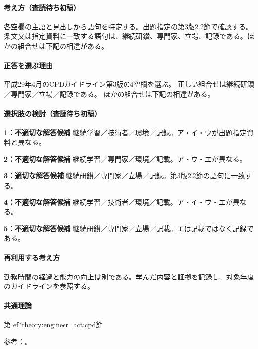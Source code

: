 \paragraph{考え方（査読待ち初稿）} 各空欄の主語と見出しから語句を特定する。出題指定の第3版2.2節で確認する。 条文又は指定資料に一致する語句は、継続研鑚、専門家、立場、記録である。ほかの組合せは下記の相違がある。

\paragraph{正答を選ぶ理由} 平成29年4月のCPDガイドライン第3版の4空欄を選ぶ。 正しい組合せは継続研鑚／専門家／立場／記録である。 ほかの組合せは下記の相違がある。

\paragraph{選択肢の検討（査読待ち初稿）}

\noindent\textbf{1：不適切な解答候補} 継続学習／技術者／環境／記録。ア・イ・ウが出題指定資料と異なる。\par

\noindent\textbf{2：不適切な解答候補} 継続学習／専門家／環境／記載。ア・ウ・エが異なる。\par

\noindent\textbf{3：適切な解答候補} 継続研鑚／専門家／立場／記録。第3版2.2節の語句に一致する。\par

\noindent\textbf{4：不適切な解答候補} 継続学習／技術者／環境／記載。ア・イ・ウ・エが異なる。\par

\noindent\textbf{5：不適切な解答候補} 継続研鑚／専門家／立場／記載。エは記載ではなく記録である。\par

\paragraph{再利用する考え方} 勤務時間の経過と能力の向上は別である。学んだ内容と証拠を記録し、対象年度のガイドラインを参照する。

\paragraph{共通理論} \hyperref[theory:engineer_act:cpd]{第
ef*{theory:engineer_act:cpd}節}

\par 参考：\cite{cpd_v3}。

